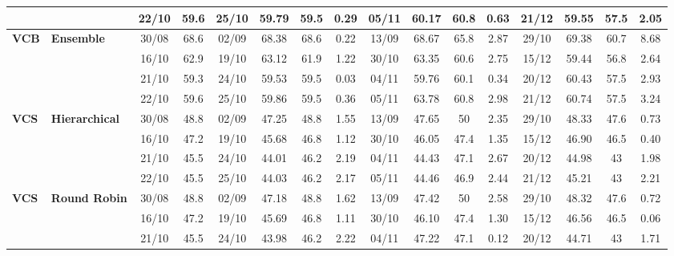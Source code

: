 \begin{table}[!h]
\begin{tabular}{llcc|cccc|cccc|cccc}
&
& 22/10 & 59.6 & 25/10 & 59.79 & 59.5 & 0.29 & 05/11 & 60.17 & 60.8 & 0.63 & 21/12 & 59.55 & 57.5 & 2.05 \\
\midrule

\multirow{4}{*}{\textbf{VCB}} 
& \textbf{Ensemble}
& 30/08 & 68.6 & 02/09 & 68.38 & 68.6 & 0.22 & 13/09 & 68.67 & 65.8 & 2.87 & 29/10 & 69.38 & 60.7 & 8.68 \\

&
& 16/10 & 62.9 & 19/10 & 63.12 & 61.9 & 1.22 & 30/10 & 63.35 & 60.6 & 2.75 & 15/12 & 59.44 & 56.8 & 2.64 \\

&
& 21/10 & 59.3 & 24/10 & 59.53 & 59.5 & 0.03 & 04/11 & 59.76 & 60.1 & 0.34 & 20/12 & 60.43 & 57.5 & 2.93 \\

&
& 22/10 & 59.6 & 25/10 & 59.86 & 59.5 & 0.36 & 05/11 & 63.78 & 60.8 & 2.98 & 21/12 & 60.74 & 57.5 & 3.24 \\
\midrule



\multirow{4}{*}{\textbf{VCS}} 
& \textbf{Hierarchical}
& 30/08 & 48.8 & 02/09 & 47.25 & 48.8 & 1.55 & 13/09 & 47.65 & 50 & 2.35 & 29/10 & 48.33 & 47.6 & 0.73 \\

&
& 16/10 & 47.2 & 19/10 & 45.68 & 46.8 & 1.12 & 30/10 & 46.05 & 47.4 & 1.35 & 15/12 & 46.90 & 46.5 & 0.40 \\

&
& 21/10 & 45.5 & 24/10 & 44.01 & 46.2 & 2.19 & 04/11 & 44.43 & 47.1 & 2.67 & 20/12 & 44.98 & 43 & 1.98 \\

&
& 22/10 & 45.5 & 25/10 & 44.03 & 46.2 & 2.17 & 05/11 & 44.46 & 46.9 & 2.44 & 21/12 & 45.21 & 43 & 2.21 \\
\midrule


\multirow{4}{*}{\textbf{VCS}} 
& \textbf{Round Robin}
& 30/08 & 48.8 & 02/09 & 47.18 & 48.8 & 1.62 & 13/09 & 47.42 & 50 & 2.58 & 29/10 & 48.32 & 47.6 & 0.72 \\

&
& 16/10 & 47.2 & 19/10 & 45.69 & 46.8 & 1.11 & 30/10 & 46.10 & 47.4 & 1.30 & 15/12 & 46.56 & 46.5 & 0.06 \\

&
& 21/10 & 45.5 & 24/10 & 43.98 & 46.2 & 2.22 & 04/11 & 47.22 & 47.1 & 0.12 & 20/12 & 44.71 & 43 & 1.71 \\


\end{tabular}
\end{table}
